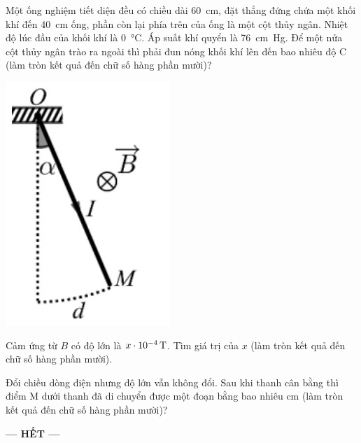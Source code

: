 \begin{ex}
	Một ống nghiệm tiết diện đều có chiều dài \SI{60}{\centi\meter}, đặt thẳng đứng chứa một khối khí đến \SI{40}{\centi\meter} ống, phần còn lại phía trên của ống là một cột thủy ngân. Nhiệt độ lúc đầu của khối khí là \SI{0}{\celsius}. Áp suất khí quyển là \SI{76}{\centi\meter Hg}. Để một nửa cột thủy ngân trào ra ngoài thì phải đun nóng khối khí lên đến bao nhiêu độ C (làm tròn kết quả đến chữ số hàng phần mười)?
	\shortans[oly]{ }
	\loigiai{
		
	}
\end{ex}
{\vspace{-0.25cm}\includegraphics[scale=0.6]{../figs/FINAL-SEM1-004-11}}
\begin{ex}
	Cảm ứng từ $B$ có độ lớn là $\xsi{x \cdot 10^{-4}}{\tesla}$. Tìm giá trị của $x$ (làm tròn kết quả đến chữ số hàng phần mười).
	\shortans[oly]{ }
	\loigiai{
		
	}
\end{ex}
\begin{ex}
	Đổi chiều dòng điện nhưng độ lớn vẫn không đổi. Sau khi thanh cân bằng thì điểm M dưới thanh đã di chuyển được một đoạn bằng bao nhiêu \si{\centi\meter} (làm tròn kết quả đến chữ số hàng phần mười)?
	\shortans[oly]{ }
	\loigiai{
		
	}
\end{ex}
\begin{center}
	\textbf{--- HẾT ---}
\end{center}

